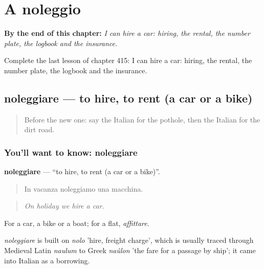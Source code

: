 
\chapter{A noleggio}
\label{ch:it-a-noleggio}

\begin{chapteropening}
\textbf{By the end of this chapter:} \emph{I can hire a car: hiring, the rental, the number plate, the logbook and the insurance.}

Complete the last lesson of chapter 415: I can hire a car: hiring, the rental, the number plate, the logbook and the insurance.
\end{chapteropening}

\section[noleggiare]{noleggiare — to hire, to rent (a car or a bike)}

\label{lesson:IT-C415-noleggiare}



\begin{quote}
Before the new one: say the Italian for the pothole, then the Italian for the dirt road.
\end{quote}

\subsection*{You'll want to know: noleggiare}
\textbf{noleggiare} — \textquotedblleft{}to hire, to rent (a car or a bike)\textquotedblright{}.

\begin{quote}
In vacanza noleggiamo una macchina.
\end{quote}

\begin{quote}
\emph{On holiday we hire a car.}
\end{quote}

For a car, a bike or a boat; for a flat, \emph{affittare}.

\begin{cousinweb}
\emph{noleggiare} is built on \emph{nolo} 'hire, freight charge', which is usually traced through Medieval Latin \emph{naulum} to Greek \emph{naûlon} 'the fare for a passage by ship'; it came into Italian as a borrowing.
\end{cousinweb}

